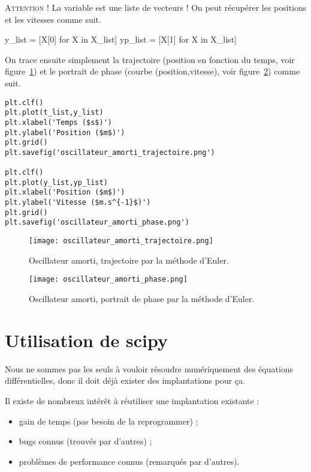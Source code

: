 \textsc{Attention !} La variable  est une liste de vecteurs ! On peut récupérer les positions et les vitesses comme suit. 

\begin{pyverbatim}
y_list = [X[0] for X in X_list]
yp_list = [X[1] for X in X_list]
\end{pyverbatim}

On trace ensuite simplement la trajectoire (position en fonction du temps, voir figure~\ref{11:fig:oscillateur_amorti_trajectoire}) et le portrait de phase (courbe (position,vitesse), voir figure~\ref{11:fig:oscillateur_amorti_phase}) comme suit. 
\begin{lstlisting}
plt.clf()
plt.plot(t_list,y_list)
plt.xlabel('Temps ($s$)')
plt.ylabel('Position ($m$)')
plt.grid()
plt.savefig('oscillateur_amorti_trajectoire.png')

plt.clf()
plt.plot(y_list,yp_list)
plt.xlabel('Position ($m$)')
plt.ylabel('Vitesse ($m.s^{-1}$)')
plt.grid()
plt.savefig('oscillateur_amorti_phase.png')
\end{lstlisting}
\begin{figure}[!h]
    \begin{center}
        \texttt{[image: oscillateur\_amorti\_trajectoire.png]}
        \caption{Oscillateur amorti, trajectoire par la méthode d'Euler.}
        \label{11:fig:oscillateur_amorti_trajectoire}
    \end{center}
\end{figure}
\begin{figure}[!h]
    \begin{center}
        \texttt{[image: oscillateur\_amorti\_phase.png]}
        \caption{Oscillateur amorti, portrait de phase par la méthode d'Euler.}
        \label{11:fig:oscillateur_amorti_phase}
    \end{center}
\end{figure}

\section{Utilisation de scipy}

Nous ne sommes pas les seuls à vouloir résoudre numériquement des
équations différentielles, donc il doit déjà exister des implantations
pour ça.

Il existe de nombreux intérêt à réutiliser une implantation existante :
\begin{itemize}
\item gain de temps (pas besoin de la reprogrammer) ;
\item bugs connus (trouvés par d'autres) ;
\item problèmes de performance connus (remarqués par d'autres).
\end{itemize}


